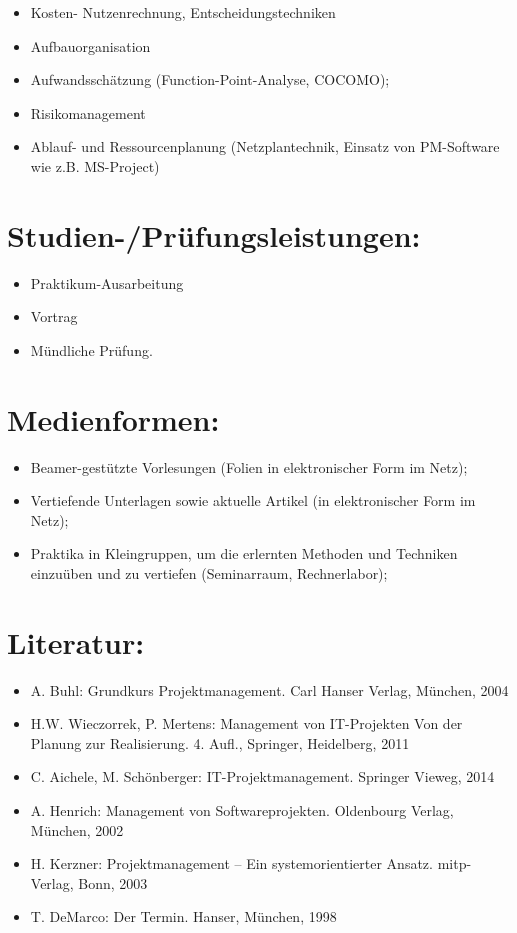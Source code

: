 \begin{itemize}
\tightlist
\item
  Kosten- Nutzenrechnung, Entscheidungstechniken
\item
  Aufbauorganisation
\item
  Aufwandsschätzung (Function-Point-Analyse, COCOMO);
\item
  Risikomanagement
\item
  Ablauf- und Ressourcenplanung (Netzplantechnik, Einsatz von
  PM-Software wie z.B. MS-Project)
\end{itemize}

\section*{Studien-/Prüfungsleistungen:}\label{studien-pruxfcfungsleistungen-18}

\begin{itemize}
\tightlist
\item
  Praktikum-Ausarbeitung
\item
  Vortrag
\item
  Mündliche Prüfung.
\end{itemize}

\section*{Medienformen:}\label{medienformen-11}

\begin{itemize}
\tightlist
\item
  Beamer-gestützte Vorlesungen (Folien in elektronischer Form im Netz);
\item
  Vertiefende Unterlagen sowie aktuelle Artikel (in elektronischer Form
  im Netz);
\item
  Praktika in Kleingruppen, um die erlernten Methoden und Techniken
  einzuüben und zu vertiefen (Seminarraum, Rechnerlabor);
\end{itemize}

\section*{Literatur:}\label{literatur-16}

\begin{itemize}
\tightlist
\item
  A. Buhl: Grundkurs Projektmanagement. Carl Hanser Verlag, München,
  2004
\item
  H.W. Wieczorrek, P. Mertens: Management von IT-Projekten Von der
  Planung zur Realisierung. 4. Aufl., Springer, Heidelberg, 2011
\item
  C. Aichele, M. Schönberger: IT-Projektmanagement. Springer Vieweg,
  2014
\item
  A. Henrich: Management von Softwareprojekten. Oldenbourg Verlag,
  München, 2002
\item
  H. Kerzner: Projektmanagement -- Ein systemorientierter Ansatz.
  mitp-Verlag, Bonn, 2003
\item
  T. DeMarco: Der Termin. Hanser, München, 1998
\end{itemize}

